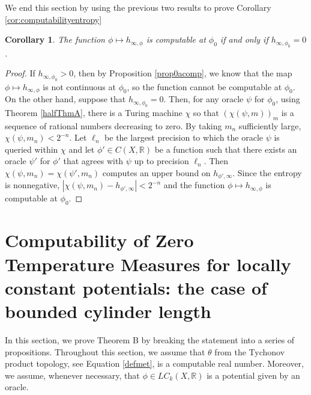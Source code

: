 \documentclass[11pt, reqno]{amsart}
\newtheorem{corollary}[theorem]{Corollary}
\newcommand{\bR}{{\mathbb R}}
\begin{document}
We end this section by using the previous two results to prove Corollary \ref{cor:computabilityentropy}
\begin{corollary}
The function $\phi\mapsto h_{\infty,\phi}$ is computable at $\phi_0$ if and only if $h_{\infty,\phi_0}=0$.
\end{corollary}
\begin{proof}
If $h_{\infty,\phi_0}>0$, then by Proposition \ref{prop0acomp}, we know that the map $\phi\mapsto h_{\infty,\phi}$ is not continuous at $\phi_0$, so the function cannot be computable at $\phi_0$.  On the other hand, suppose that $h_{\infty,\phi_0}=0$.  Then, for any oracle $\psi$ for $\phi_0$, using Theorem \ref{halfThmA}, there is a Turing machine $\chi$ so that $(\chi(\psi,m))_m$ is a sequence of rational numbers decreasing to zero.  By taking $m_n$ sufficiently large, $\chi(\psi,m_n)<2^{-n}$.  Let $\ell_n$ be the largest precision to which the oracle $\psi$ is queried within $\chi$ and let $\phi'\in C(X,\bR)$ be a function such that there exists an oracle $\psi'$ for $\phi'$ that agrees with $\psi$ up to precision $\ell_n$.  Then $\chi(\psi,m_n)=\chi(\psi',m_n)$ computes an upper bound on $h_{\phi',\infty}$.  Since the entropy is nonnegative, $|\chi(\psi,m_n)-h_{\phi',\infty}|<2^{-n}$ and the function $\phi\mapsto h_{\infty,\phi}$ is computable at $\phi_0$.
\end{proof}




\section{Computability of Zero Temperature Measures for locally constant potentials: the case of bounded cylinder length}\label{sec:4}


In this section, we prove Theorem B by breaking the statement into a series of propositions.  Throughout this section, we assume that $\theta$ from the Tychonov product topology, see Equation \eqref{defmet}, is a computable real number.  Moreover, we assume, whenever necessary, that $\phi\in LC_k(X,\bR)$ is a potential given by an oracle.
\end{document}
